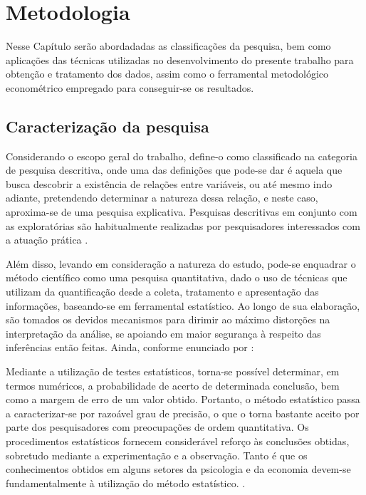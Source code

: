 
\chapter{Metodologia}

Nesse Capítulo serão abordadadas as classificações da pesquisa, bem como aplicações das técnicas utilizadas no desenvolvimento do presente trabalho para obtenção e tratamento dos dados, assim como o ferramental metodológico econométrico empregado para conseguir-se os resultados.

\section{Caracterização da pesquisa}

Considerando o escopo geral do trabalho, define-o como classificado na categoria de pesquisa descritiva, onde uma das definições que pode-se dar é aquela que busca descobrir a existência de relações entre variáveis, ou até mesmo indo adiante, pretendendo determinar a natureza dessa relação, e neste caso, aproxima-se de uma pesquisa explicativa. Pesquisas descritivas em conjunto com as exploratórias são habitualmente realizadas por pesquisadores interessados com a atuação prática \cite{gil2008metodos}.

Além disso, levando em consideração a natureza do estudo, pode-se enquadrar o método científico como uma pesquisa quantitativa, dado o uso de técnicas que utilizam da quantificação desde a coleta, tratamento e apresentação das informações, baseando-se em ferramental estatístico. Ao longo de sua elaboração, são tomados os devidos mecanismos para dirimir ao máximo distorções na interpretação da análise, se apoiando em maior segurança à respeito das inferências então feitas. Ainda, conforme enunciado por :

\begin{citacao}

Mediante a utilização de testes estatísticos, torna-se possível determinar, em termos numéricos, a probabilidade de acerto de determinada conclusão, bem como a margem de erro de um valor obtido. Portanto, o método estatístico passa a caracterizar-se por razoável grau de precisão, o que o torna bastante aceito por parte dos pesquisadores com preocupações de ordem quantitativa. Os procedimentos estatísticos fornecem considerável reforço às conclusões obtidas, sobretudo mediante a experimentação e a observação. Tanto é que os conhecimentos obtidos em alguns setores da psicologia e da economia devem-se fundamentalmente à utilização do método estatístico. \cite{gil2008metodos}.

\end{citacao}

